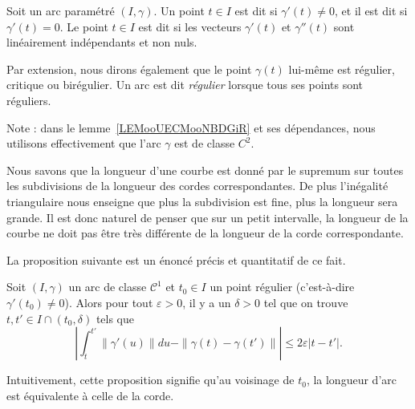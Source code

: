 \begin{definition}
	Soit un arc paramétré $(I,\gamma)$. Un point $t\in I$ est dit  si $\gamma'(t)\neq 0$, et il est dit  si $\gamma'(t)=0$. Le point $t\in I$ est dit  si les vecteurs $\gamma'(t)$ et $\gamma''(t)$ sont linéairement indépendants et non nuls.

	Par extension, nous dirons également que le point $\gamma(t)$ lui-même est régulier, critique ou birégulier. Un arc est dit \emph{régulier} lorsque tous ses points sont réguliers.
\end{definition}
Note : dans le lemme~\ref{LEMooUECMooNBDGiR} et ses dépendances, nous utilisons effectivement que l'arc \( \gamma\) est de classe \( C^2\).

Nous savons que la longueur d'une courbe est donné par le supremum sur toutes les subdivisions de la longueur des cordes correspondantes. De plus l'inégalité triangulaire nous enseigne que plus la subdivision est fine, plus la longueur sera grande. Il est donc naturel de penser que sur un petit intervalle, la longueur de la courbe ne doit pas être très différente de la longueur de la corde correspondante.

La proposition suivante est un énoncé précis et quantitatif de ce fait.
\begin{proposition}
	Soit $(I,\gamma)$ un arc de classe $\mathcal{C}^1$ et $t_0\in I$ un point régulier (c'est-à-dire $\gamma'(t_0)\neq 0$). Alors pour tout $\varepsilon>0$, il y a un $\delta>0$ tel que on trouve  $t,t'\in I\cap(t_0,\delta)$ tels que
	\begin{equation}
		\left| \int_t^{t'}\| \gamma'(u) \|du-\| \gamma(t)-\gamma(t') \| \right| \leq 2\varepsilon| t-t' |.
	\end{equation}
\end{proposition}
Intuitivement, cette proposition signifie qu'au voisinage de $t_0$, la longueur d'arc est équivalente à celle de la corde.

